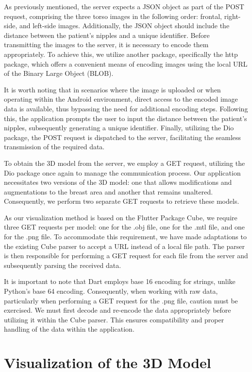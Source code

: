 As previously mentioned, the server expects a JSON object as part of the POST request, comprising the three torso images in the following order: 
frontal, right-side, and left-side images. Additionally, the JSON object should include the distance between the patient's nipples and a unique identifier. 
Before transmitting the images to the server, it is necessary to encode them appropriately. To achieve this, we utilize another package, 
specifically the http package, which offers a convenient means of encoding images using the local URL of the Binary Large Object (BLOB).

It is worth noting that in scenarios where the image is uploaded or when operating within the Android environment, 
direct access to the encoded image data is available, thus bypassing the need for additional encoding steps. Following this, 
the application prompts the user to input the distance between the patient's nipples, subsequently generating a unique identifier. Finally, 
utilizing the Dio package, the POST request is dispatched to the server, facilitating the seamless transmission of the required data.

To obtain the 3D model from the server, we employ a GET request, utilizing the Dio package once again to manage the communication process. 
Our application necessitates two versions of the 3D model: one that allows modifications and augmentations to the breast area and another 
that remains unaltered. Consequently, we perform two separate GET requests to retrieve these models.

As our visualization method is based on the Flutter Package Cube, we require three GET requests per model: one for the .obj file, one for 
the .mtl file, and one for the .png file. To accommodate this requirement, we have made adaptations to the existing Cube parser to accept 
a URL instead of a local file path. The parser is then responsible for performing a GET request for each file from the server and subsequently parsing the received data.

It is important to note that Dart employs base 16 encoding for strings, unlike Python's base 64 encoding. Consequently, when working with raw data, 
particularly when performing a GET request for the .png file, caution must be exercised. We must first decode and re-encode the data appropriately 
before utilizing it within the Cube parser. This ensures compatibility and proper handling of the data within the application.

\section{Visualization of the 3D Model}

